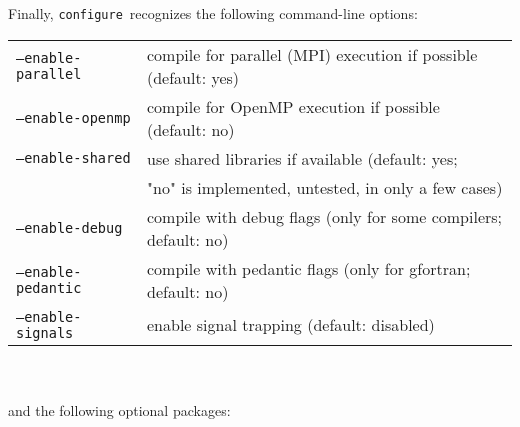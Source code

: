 \documentclass[12pt,a4paper]{article}
\def\configure{\texttt{configure}}
\begin{document}
Finally, \configure\ recognizes the following command-line options:\\
\begin{tabular}{ll}
\texttt{--enable-parallel}&     compile for parallel (MPI) execution if possible (default: yes)\\
\texttt{--enable-openmp}&       compile for OpenMP execution if possible (default: no)\\
\texttt{--enable-shared}&       use shared libraries if available (default: yes;\\
                        &       "no" is implemented, untested, in only a few cases)\\
\texttt{--enable-debug}&        compile with debug flags (only for some compilers; default: no)\\
\texttt{--enable-pedantic}&     compile with pedantic flags (only for gfortran; default: no)\\
\texttt{--enable-signals}&      enable signal trapping (default: disabled)\\
\end{tabular}\\
\\
and the following optional packages:\\
\end{document}
